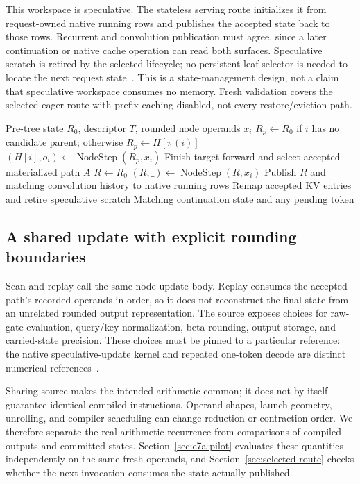 \documentclass[conference]{IEEEtran}
\begin{document}
This workspace is speculative. The stateless serving route initializes it from request-owned native running rows and publishes the accepted state back to those rows. Recurrent and convolution publication must agree, since a later continuation or native cache operation can read both surfaces. Speculative scratch is retired by the selected lifecycle; no persistent leaf selector is needed to locate the next request state~\cite{lumo2026stateless}. This is a state-management design, not a claim that speculative workspace consumes no memory. Fresh validation covers the selected eager route with prefix caching disabled, not every restore/eviction path.

\begin{algorithm}[t]
\caption{Logical scan and selected-path publication; compiled loops may include masked padding.}
\label{alg:scan-replay}
\begin{algorithmic}[1]
\REQUIRE Pre-tree state $R_0$, descriptor $T$, rounded node operands $x_i$
\STATE $R_p\gets R_0$ if $i$ has no candidate parent; otherwise $R_p\gets H[\pi(i)]$
\STATE $(H[i],o_i)\gets\operatorname{NodeStep}(R_p,x_i)$
\ENDFOR
\STATE Finish target forward and select accepted materialized path $A$
\STATE $R\gets R_0$
\STATE $(R,\_)\gets\operatorname{NodeStep}(R,x_i)$
\ENDFOR
\STATE Publish $R$ and matching convolution history to native running rows
\STATE Remap accepted KV entries and retire speculative scratch
\RETURN Matching continuation state and any pending token
\end{algorithmic}
\end{algorithm}

\subsection{A shared update with explicit rounding boundaries}
Scan and replay call the same node-update body. Replay consumes the accepted path's recorded operands in order, so it does not reconstruct the final state from an unrelated rounded output representation. The source exposes choices for raw-gate evaluation, query/key normalization, beta rounding, output storage, and carried-state precision. These choices must be pinned to a particular reference: the native speculative-update kernel and repeated one-token decode are distinct numerical references~\cite{lumo2026archive}.

Sharing source makes the intended arithmetic common; it does not by itself guarantee identical compiled instructions. Operand shapes, launch geometry, unrolling, and compiler scheduling can change reduction or contraction order. We therefore separate the real-arithmetic recurrence from comparisons of compiled outputs and committed states. Section~\ref{sec:e7a-pilot} evaluates these quantities independently on the same fresh operands, and Section~\ref{sec:selected-route} checks whether the next invocation consumes the state actually published.
\end{document}
